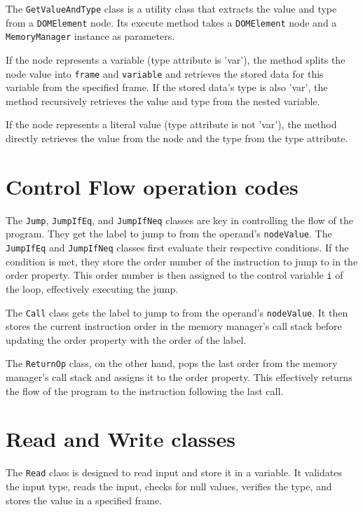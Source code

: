 \documentclass[10pt,a4paper]{article}
\begin{document}
The \texttt{GetValueAndType} class is a utility class that extracts the value and type from a \texttt{DOMElement} node. Its execute method takes a \texttt{DOMElement} node and a \texttt{MemoryManager} instance as parameters.

If the node represents a variable (type attribute is 'var'), the method splits the node value into \texttt{frame} and \texttt{variable} and retrieves the stored data for this variable from the specified frame. If the stored data's type is also 'var', the method recursively retrieves the value and type from the nested variable.

If the node represents a literal value (type attribute is not 'var'), the method directly retrieves the value from the node and the type from the type attribute.

\section*{Control Flow operation codes}

The \texttt{Jump}, \texttt{JumpIfEq}, and \texttt{JumpIfNeq} classes are key in controlling the flow of the program. They get the label to jump to from the operand's \texttt{nodeValue}. The \texttt{JumpIfEq} and \texttt{JumpIfNeq} classes first evaluate their respective conditions. If the condition is met, they store the order number of the instruction to jump to in the order property. This order number is then assigned to the control variable \texttt{i} of the loop, effectively executing the jump.

The \texttt{Call} class gets the label to jump to from the operand's \texttt{nodeValue}. It then stores the current instruction order in the memory manager's call stack before updating the order property with the order of the label.

The \texttt{ReturnOp} class, on the other hand, pops the last order from the memory manager's call stack and assigns it to the order property. This effectively returns the flow of the program to the instruction following the last call.

\section*{Read and Write classes}
The \texttt{Read} class is designed to read input and store it in a variable. It validates the input type, reads the input, checks for null values, verifies the type, and stores the value in a specified frame.
\end{document}
